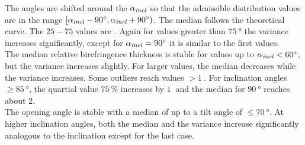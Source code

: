 The angles are shifted around the $\textnormal{$\alpha_{\mathit{incl}}$}$ so that the admissible distribution values are in the range $[\textnormal{$\alpha_{\mathit{incl}}$}-\SI{90}{\degree}, \textnormal{$\alpha_{\mathit{incl}}$}+\SI{90}{\degree})$.
The median follows the theoretical curve.
The $25-75$ values are \dummy{} .
Again for values greater than $\SI{75}{\degree}$ the variance increases significantly, except for $\textnormal{$\alpha_{\mathit{incl}}$} = \SI{90}{\degree}$ it is similar to the first values.
\\
% 
The median relative birefringence thickness \trel{} is stable for values up to $\textnormal{$\alpha_{\mathit{incl}}$} < \SI{60}{\degree}$, but the variance increases slightly.
For larger values, the median decreases while the variance increases.
Some outliers reach values $>\SI{1}{}$.
For inclination angles $\ge \SI{85}{\degree}$, the quartial value $\SI{75}{\percent}$ increases by $\SI{1}{}$ and the median for $\SI{90}{\degree}$ reaches about 2.
\\
% 
The opening angle is stable with a median of \dummy{} up to a tilt angle of $\le \SI{70}{\degree}$.
At higher inclination angles, both the median and the variance increase significantly analogous to the inclination except for the last case.
% 
% 
% 
